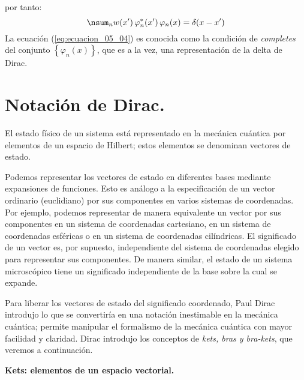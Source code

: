 por tanto:
\begin{equation}
\nsum_{n} w(x^{\prime}) \, \varphi_{n}^{*} (x^{\prime}) \, \varphi_{n} (x) = \delta(x - x^{\prime})
\label{eq:ecuacion_05_04}
\end{equation}
La ecuación (\ref{eq:ecuacion_05_04}) es conocida como la condición de \emph{completes} del conjunto $\left\{ \varphi_{n} (x) \right\}$, que es a la vez, una representación de la delta de Dirac.
\newpage

\section{Notación de Dirac.}

El estado físico de un sistema está representado en la mecánica cuántica por elementos de un espacio de Hilbert; estos elementos se denominan vectores de estado. 
\par
Podemos representar los vectores de estado en diferentes bases mediante expansiones de funciones. Esto es análogo a la especificación de un vector ordinario (euclidiano) por sus componentes en varios sistemas de coordenadas. Por ejemplo, podemos representar de manera equivalente un vector por sus componentes en un sistema de coordenadas cartesiano, en un sistema de coordenadas esféricas o en un sistema de coordenadas cilíndricas. El significado de un vector es, por supuesto, independiente del sistema de coordenadas elegido para representar sus componentes. De manera similar, el estado de un sistema microscópico tiene un significado independiente de la base sobre la cual se expande.
\par
Para liberar los vectores de estado del significado coordenado, Paul Dirac introdujo lo que se convertiría en una notación inestimable en la mecánica cuántica; permite manipular el formalismo de la mecánica cuántica con mayor facilidad y claridad. Dirac introdujo los conceptos de \emph{kets, bras y bra-kets}, que veremos a continuación.
\par
\textbf{Kets: elementos de un espacio vectorial.}

